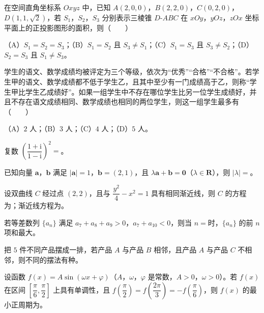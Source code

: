 \begin{question}
在空间直角坐标系 $Oxyz$ 中，已知 $A(2,0,0)$，$B(2,2,0)$，$C(0,2,0)$，$D(1,1,\sqrt2)$，若 $S_1$，$S_2$，$S_3$ 分别表示三棱锥 $D\text{-}ABC$ 在 $xOy$，$yOz$，$zOx$ 坐标平面上的正投影图形的面积，则\mbox{（　　）}

（A）$S_1=S_2=S_3$；（B）$S_1=S_2$ 且 $S_3\neq S_1$；（C）$S_1=S_3$ 且 $S_3\neq S_2$；（D）$S_2=S_3$ 且 $S_1\neq S_3$。

\end{question}
\begin{question}
学生的语文、数学成绩均被评定为三个等级，依次为“优秀”“合格”“不合格”。若学生甲的语文、数学成绩都不低于学生乙，且其中至少有一门成绩高于乙，则称“学生甲比学生乙成绩好”。如果一组学生中不存在哪位学生比另一位学生成绩好，并且不存在语文成绩相同、数学成绩也相同的两位学生，则这一组学生最多有\mbox{（　　）}

（A）$2$ 人；（B）$3$ 人；（C）$4$ 人；（D）$5$ 人。

\end{question}

\begin{question}
复数 $\left(\dfrac{1+\mathrm i}{1-\mathrm i}\right)^2=$\gkblank{}。

\end{question}
\begin{question}
已知向量 $\boldsymbol a$，$\boldsymbol b$ 满足 $|\boldsymbol a|=1$，$\boldsymbol b=(2,1)$，且 $\lambda\boldsymbol a+\boldsymbol b=\boldsymbol 0$（$\lambda\in\mathbf R$），则 $|\lambda|=$\gkblank{}。

\end{question}
\begin{question}
设双曲线 $C$ 经过点 $(2,2)$，且与 $\dfrac{y^2}4-x^2=1$ 具有相同渐近线，则 $C$ 的方程为\gkblank{}；渐近线方程为\gkblank{}。

\end{question}
\begin{question}
若等差数列 $\{a_n\}$ 满足 $a_7+a_8+a_9>0$，$a_7+a_{10}<0$，则当 $n=$\gkblank{}时，$\{a_n\}$ 的前 $n$ 项和最大。

\end{question}
\begin{question}
把 $5$ 件不同产品摆成一排，若产品 $A$ 与产品 $B$ 相邻，且产品 $A$ 与产品 $C$ 不相邻，则不同的摆法有\gkblank{}种。

\end{question}
\begin{question}
设函数 $f(x)=A\sin(\omega x+\varphi)$（$A$，$\omega$，$\varphi$ 是常数，$A>0$，$\omega>0$）。若 $f(x)$ 在区间 $\left[\dfrac\pi6,\dfrac\pi2\right]$ 上具有单调性，且 $f\left(\dfrac\pi2\right)=f\left(\dfrac{2\pi}3\right)=-f\left(\dfrac\pi6\right)$，则 $f(x)$ 的最小正周期为\gkblank{}。

\end{question}

